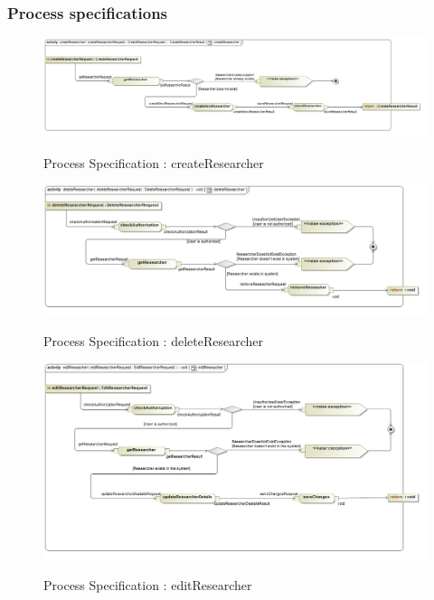 \documentclass{article}
\begin{document}
	\subsubsection{Process specifications}
	
		\begin{figure}[H]
			\includegraphics[width=\textwidth]{Rohan_Diagrams/createResearcherProcessSpec.jpg}  \\
			\caption{Process Specification : createResearcher}
		\end{figure}
		\begin{figure}[H]
			\includegraphics[width=\textwidth]{Rohan_Diagrams/deleteResearcherProcessSpec.jpg}  \\
			\caption{Process Specification : deleteResearcher}
		\end{figure}
		\begin{figure}[H]
			\includegraphics[width=\textwidth]{Rohan_Diagrams/editReseacherProcessSpec.jpg}  \\
			\caption{Process Specification : editResearcher}
		\end{figure}
\end{document}
